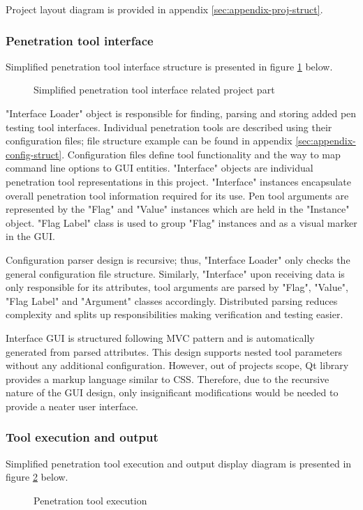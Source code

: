 Project layout diagram is provided in appendix \ref{sec:appendix-proj-struct}.


\subsubsection{Penetration tool interface}
Simplified penetration tool interface structure is presented in figure \ref {fig:interface-class} below. \newline

\begin{figure}[!htb]
	\caption{\label{fig:interface-class} Simplified penetration tool interface related project part}
\end{figure}

"Interface Loader" object is responsible for finding, parsing and storing added pen testing tool interfaces. Individual penetration tools are described using their configuration files; file structure example can be found in appendix \ref{sec:appendix-config-struct}. Configuration files define tool functionality and the way to map command line options to GUI entities. "Interface" objects are individual penetration tool representations in this project. "Interface" instances encapsulate overall penetration tool information required for its use. Pen tool arguments are represented by the "Flag" and "Value" instances which are held in the "Instance" object. "Flag Label" class is used to group "Flag" instances and as a visual marker in the GUI. 

Configuration parser design is recursive; thus, "Interface Loader" only checks the general configuration file structure. Similarly, "Interface" upon receiving data is only responsible for its attributes, tool arguments are parsed by "Flag", "Value", "Flag Label" and "Argument" classes accordingly. Distributed parsing reduces complexity and splits up responsibilities making verification and testing easier.

Interface GUI is structured following MVC pattern and is automatically generated from parsed attributes. This design supports nested tool parameters without any additional configuration. However, out of projects scope, Qt library provides a markup language similar to CSS. Therefore, due to the recursive nature of the GUI design, only insignificant modifications would be needed to provide a neater user interface.


\subsubsection{Tool execution and output}\label{tool-execution}
Simplified penetration tool execution and output display diagram is presented in figure \ref{fig:manager-struct} below.
\begin{figure}[!htb]
	\caption{\label{fig:manager-struct} Penetration tool execution}
\end{figure}

